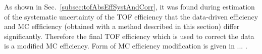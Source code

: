 As shown in Sec.~\ref{subsec:tofAbsEffSystAndCorr}, it was found during estimation of the systematic uncertainty of the TOF efficiency that the data-driven efficiency and MC effficiency (obtained with a method described in this section) differ significantly. Therefore the final TOF efficiency which is used to correct the data is a modified MC efficiency. Form of MC efficiency modification is given in ... .

% 
% 
